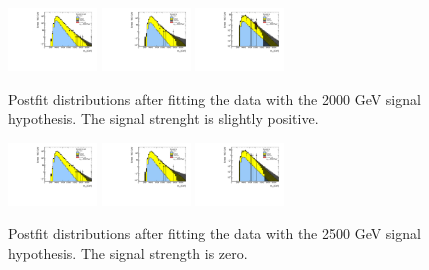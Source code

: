 \begin{figure}[htbp!]
\begin{center}
\includegraphics[width=0.21\textwidth,angle=-90]{figures/boosted/results/postfitplot_s_2000_b2b.pdf} 
\includegraphics[width=0.21\textwidth,angle=-90]{figures/boosted/results/postfitplot_s_2000_b3b.pdf} 
\includegraphics[width=0.21\textwidth,angle=-90]{figures/boosted/results/postfitplot_s_2000_b4b.pdf} 
\caption{Postfit distributions after fitting the data with the 2000 GeV signal hypothesis. The signal strenght is slightly positive.}
\label{fig:postfit2000}
\end{center}
\end{figure}

\begin{figure}[htbp!]
\begin{center}
\includegraphics[width=0.21\textwidth,angle=-90]{figures/boosted/results/postfitplot_s_2500_b2b.pdf} 
\includegraphics[width=0.21\textwidth,angle=-90]{figures/boosted/results/postfitplot_s_2500_b3b.pdf} 
\includegraphics[width=0.21\textwidth,angle=-90]{figures/boosted/results/postfitplot_s_2500_b4b.pdf} 
\caption{Postfit distributions after fitting the data with the 2500 GeV signal hypothesis. The signal strength is zero.}
\label{fig:postfit2500}
\end{center}
\end{figure}

